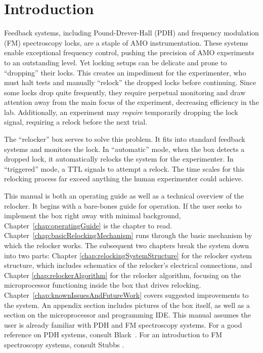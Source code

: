 \documentclass[10pt]{report}
\begin{document}

\chapter{Introduction}
\label{chap:introduction}

Feedback systems, including Pound-Drever-Hall (PDH) and frequency modulation (FM) spectroscopy locks, are a staple of AMO instrumentation. These systems enable exceptional frequency control, pushing the precision of AMO experiments to an outstanding level. Yet locking setups can be delicate and prone to ``dropping'' their locks. This creates an impediment for the experimenter, who must halt tests and manually ``relock'' the dropped locks before continuing. Since some locks drop quite frequently, they require perpetual monitoring and draw attention away from the main focus of the experiment, decreasing efficiency in the lab. Additionally, an experiment may \textit{require} temporarily dropping the lock signal, requiring a relock before the next trial.

The ``relocker'' box serves to solve this problem. It fits into standard feedback systems and monitors the lock. In ``automatic'' mode, when the box detects a dropped lock, it automatically relocks the system for the experimenter. In ``triggered'' mode, a TTL signals to attempt a relock. The time scales for this relocking process far exceed anything the human experimenter could achieve.

This manual is both an operating guide as well as a technical overview of the relocker. It begins with a bare-bones guide for operation. If the user seeks to implement the box right away with minimal background, Chapter~\ref{chap:operatingGuide} is the chapter to read. Chapter~\ref{chap:basicRelockingMechanism} runs through the basic mechanism by which the relocker works. The subsequent two chapters break the system down into two parts: Chapter \ref{chap:relockingSystemStructure} for the relocker system structure, which includes schematics of the relocker's electrical connections, and Chapter \ref{chap:relockerAlgorithm} for the relocker algorithm, focusing on the microprocessor functioning inside the box that drives relocking. Chapter~\ref{chap:knownIssuesAndFutureWork} covers suggested improvements to the system. An appendix section includes pictures of the box itself, as well as a section on the microprocessor and programming IDE. This manual assumes the user is already familiar with PDH and FM spectroscopy systems. For a good reference on PDH systems, consult Black~\cite{black2001introduction}. For an introduction to FM spectroscopy systems, consult Stubbs \cite{spectroscopy}.
\end{document}
